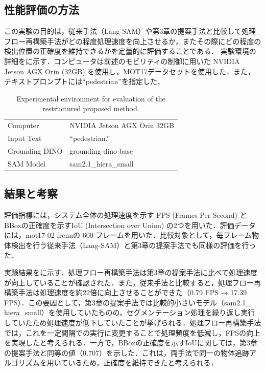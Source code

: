 \subsection{性能評価の方法}
この実験の目的は，従来手法（Lang-SAM）や第3章の提案手法と比較して処理フロー再構築手法がどの程度処理速度を向上させるか，またその際にどの程度の検出位置の正確度を維持できるかを定量的に評価することである．
実験環境の詳細をに示す．コンピュータは前述のモビリティの制御に用いた NVIDIA Jetson AGX Orin (32GB) を使用し，MOT17データセット\cite{mot16}を使用した．また，テキストプロンプトには“pedestrian”を指定した．

\vspace{1cm}

\begin{table}[htbp]
\centering
\caption{Experimental environment for evaluation of the restructured proposed method.}
\label{tab:env_evaluation_improved}
\begin{tabular}{ll}
\hline
Computer & NVIDIA Jetson AGX Orin 32GB \\
Input Text & ``pedestrian.'' \\
Grounding DINO & grounding-dino-base \\
SAM Model & sam2.1\_hiera\_small \\
\hline
\end{tabular}
\end{table}

\newpage

\subsection{結果と考察}
評価指標には，システム全体の処理速度を示す FPS (Frames Per Second) とBBoxの正確度を示すIoU (Intersection over Union) の2つを用いた．評価データには，mot17-02-frcnnの 600 フレームを用いた．比較対象として，毎フレーム物体検出を行う従来手法（Lang-SAM）と第3章の提案手法でも同様の評価を行った．

実験結果をに示す．処理フロー再構築手法は第3章の提案手法に比べて処理速度が向上していることが確認された．また，従来手法と比較すると，処理フロー再構築手法は処理速度を約22倍に向上させることができた（0.79 FPS → 17.39 FPS）．この要因として，第3章の提案手法では比較的小さいモデル（sam2.1\_ hiera\_small）を使用していたものの，セグメンテーション処理を繰り返し実行していたため処理速度が低下していたことが挙げられる．処理フロー再構築手法では，これを一定間隔での実行に変更することで処理頻度を低減し，FPSの向上を実現したと考えられる．一方で，BBoxの正確度を示すIoUに関しては，第3章の提案手法と同等の値（0.707）を示した．これは，両手法で同一の物体追跡アルゴリズムを用いているため，正確度を維持できたと考えられる．

